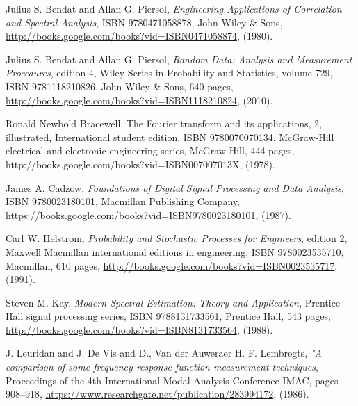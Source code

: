 \begin{thebibliography}{99}

         Julius S. Bendat and Allan G. Piersol, 
         \emph{Engineering Applications of Correlation and Spectral Analysis}, 
         ISBN 9780471058878, John Wiley \& Sons,
         \url{http://books.google.com/books?vid=ISBN0471058874},
         (1980).

         Julius S. Bendat and Allan G. Piersol, 
         \emph{Random Data: Analysis and Measurement Procedures}, edition 4,
         {Wiley Series in Probability and Statistics}, volume 729,
         ISBN 9781118210826, John Wiley \& Sons, 640 pages,
         \url{http://books.google.com/books?vid=ISBN1118210824},
         (2010).

        {Ronald Newbold Bracewell},
        {The Fourier transform and its applications},
        {2, illustrated, International student edition},
        {ISBN 9780070070134},
        {McGraw-Hill electrical and electronic engineering series},
        {McGraw-Hill},
        {444 pages},
        {http://books.google.com/books?vid=ISBN007007013X},
        (1978).

         {James A. Cadzow},
         \emph{Foundations of Digital Signal Processing and Data Analysis},
         ISBN {9780023180101}, {Macmillan Publishing Company},
         \url{https://books.google.com/books?vid=ISBN9780023180101},
         (1987).

         Carl W. Helstrom,
         \emph{Probability and Stochastic Processes for Engineers},
         edition 2,
         {Maxwell Macmillan international editions in engineering},
         ISBN 9780023535710, Macmillan, 610 pages,
         \url{http://books.google.com/books?vid=ISBN0023535717},
         (1991).

         Steven M. Kay,
         \emph{Modern Spectral Estimation: Theory and Application},
         Prentice-Hall signal processing series,
         ISBN 9788131733561, Prentice Hall, 543 pages,
         \url{http://books.google.com/books?vid=ISBN8131733564},
         (1988).

        {J. Leuridan and J. De Vis and D., Van der Auweraer H. F. Lembregts},
         \emph{"A comparison of some frequency response function measurement techniques},
         {Proceedings of the 4th International Modal Analysis Conference IMAC},
         pages 908--918,
         \url{https://www.researchgate.net/publication/283994172},
         (1986).


\end{thebibliography}
